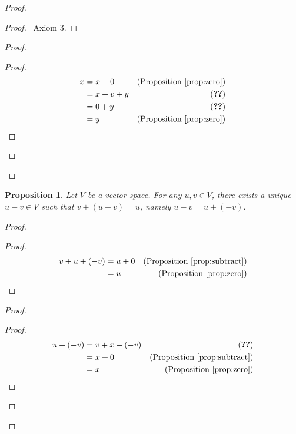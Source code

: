 \documentclass{book}
\let\qed\relax
\newtheorem{prop}[ax]{Proposition}
\theoremstyle{definition}
\begin{document}
\begin{proof}
\pf
{}
\begin{proof}
	\pf\ Axiom 3.
\end{proof}
\begin{proof}
	\begin{proof}
	\pf
		\begin{align*}
			x & = x + 0 & (\text{Proposition \ref{prop:zero}}) \\
			& = x + v + y & (\text{\stepref{b}}) \\
			& = 0 + y & (\text{\stepref{a}}) \\
			& = y & (\text{Proposition \ref{prop:zero}})
		\end{align*}
	\end{proof}
\end{proof}
\qed
\end{proof}

\begin{prop}
Let $V$ be a vector space. For any $u,v \in V$, there exists a unique $u-v \in V$ such that $v + (u-v) = u$, namely $u-v = u + (-v)$.
\end{prop}

\begin{proof}
\pf
{}
\begin{proof}
	\pf
	\begin{align*}
	v + u + (-v) & = u + 0 & (\text{Proposition \ref{prop:subtract}}) \\
	& = u & (\text{Proposition \ref{prop:zero}})
	\end{align*}
\end{proof}
\begin{proof}
	\begin{proof}
		\pf
		\begin{align*}
			u + (-v) & = v + x + (-v) & (\text{\stepref{b}}) \\
			& = x + 0 & (\text{Proposition \ref{prop:subtract}}) \\
			& = x & (\text{Proposition \ref{prop:zero}})
		\end{align*}
	\end{proof}
\end{proof}
\qed
\end{proof}
\end{document}
